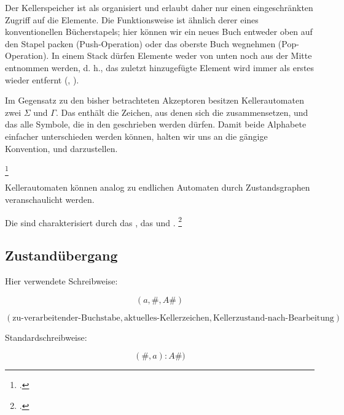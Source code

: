 \documentclass{lehramt-informatik-haupt}
\begin{document}
Der Kellerspeicher ist als  organisiert und
erlaubt daher nur einen eingeschränkten Zugriff auf die Elemente. Die
Funktionsweise ist ähnlich derer eines konventionellen Bücherstapels;
hier können wir ein neues Buch entweder oben auf den Stapel packen
(Push-Operation) oder das oberste Buch wegnehmen (Pop-Operation). In
einem Stack dürfen Elemente weder von unten noch aus der Mitte entnommen
werden, d. h., das zuletzt hinzugefügte Element wird immer als erstes
wieder entfernt (, ).

Im Gegensatz zu den bisher betrachteten Akzeptoren besitzen
Kellerautomaten zwei  $\Sigma$ und
$\Gamma$. Das  enthält die Zeichen, aus
denen sich die  zusammensetzen, und das
 alle Symbole, die in den
 geschrieben werden dürfen. Damit beide Alphabete
einfacher unterschieden werden können, halten wir uns an die gängige
Konvention,  und
 darzustellen.

\footcite[Seite 224]{hoffmann}

Kellerautomaten können analog zu endlichen Automaten durch
Zustandsgraphen veranschaulicht werden.

Die  sind charakterisiert durch das
, das  und
.
\footcite[Seite 23]{theo:fs:2}

\subsection{Zustandübergang}

Hier verwendete Schreibweise:

\begin{displaymath}
(a, \#, A\#)
\end{displaymath}

\begin{displaymath}
(
\text{zu-verarbeitender-Buchstabe},
\text{aktuelles-Kellerzeichen},
\text{Kellerzustand-nach-Bearbeitung}
)
\end{displaymath}

Standardschreibweise:

\begin{displaymath}
(\#, a): A\#)
\end{displaymath}
\end{document}
